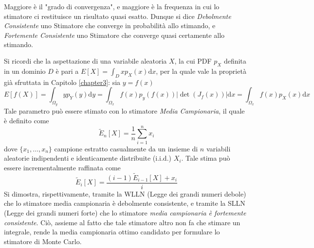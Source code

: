 Maggiore \`e il "grado di convergenza", e maggiore \`e la frequenza in cui lo stimatore ci restituisce un risultato quasi esatto. Dunque si dice
\textit{Debolmente Consistente} uno Stimatore che converge in probabilit\`a allo stimando, e \textit{Fortemente Consistente} uno Stimatore che 
converge quasi certamente allo stimando.\par
Si ricordi che la aspettazione di una variabile aleatoria $X$, la cui PDF $p_X$ definita in un dominio $D$ \`e pari a 
\mbox{$E[X]=\int_Dxp_X(x)\mathrm{d}x$}, per la quale vale la propriet\`a gi\`a sfruttata in Capitolo \ref{chapter3}: sia $y=f(x)$
\begin{equation*}
	E[f(X)]=\int_{\Omega_y}yp_Y(y)\mathrm{d}y=\int_{\Omega_x}f(x)p_y(f(x))\left|\det(J_f(x))\right|\mathrm{d}x=\int_{\Omega_x}f(x)p_X(x)\mathrm{d}x
\end{equation*}
Tale parametro pu\`o essere stimato con lo stimatore \textit{Media Campionaria}, il quale \`e definito come 
\begin{equation}
	\tilde{E}_n[X]=\frac{1}{n}\sum_{i=1}^nx_i
\end{equation}
dove $\{x_1,\ldots,x_n\}$ campione estratto casualmente da un insieme di $n$ variabili aleatorie indipendenti e identicamente distribuite (i.i.d.) 
$X_i$.
Tale stima pu\`o essere incrementalmente raffinata come 
\begin{equation}
	\tilde{E}_i[X]=\frac{(i-1)\tilde{E}_{i-1}[X]+x_i}{i}
\end{equation}
Si dimostra, rispettivamente, tramite la WLLN (Legge dei grandi numeri debole) che lo stimatore media campionaria \`e debolmente consistente, e tramite
la SLLN (Legge dei grandi numeri forte) che lo stimatore \textit{media campionaria \`e fortemente consistente}. Ci\`o, assieme al fatto che 
tale stimatore altro non fa che stimare un integrale, rende la media campionaria ottimo candidato per formulare lo stimatore di Monte Carlo.\par
